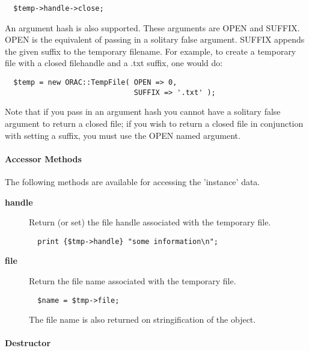 \begin{description}
\begin{description}
\begin{verbatim}
  $temp->handle->close;
\end{verbatim}


An argument hash is also supported. These arguments are OPEN and
SUFFIX. OPEN is the equivalent of passing in a solitary false
argument. SUFFIX appends the given suffix to the temporary
filename. For example, to create a temporary file with a closed
filehandle and a .txt suffix, one would do:

\begin{verbatim}
  $temp = new ORAC::TempFile( OPEN => 0,
                              SUFFIX => '.txt' );
\end{verbatim}


Note that if you pass in an argument hash you cannot have a solitary
false argument to return a closed file; if you wish to return a closed
file in conjunction with setting a suffix, you must use the OPEN named
argument.

\end{description}
\paragraph*{Accessor Methods\label{ORAC::TempFile_Accessor_Methods}}


The following methods are available for accessing the
'instance' data.

\begin{description}

\item[{\textbf{handle}}] \mbox{}

Return (or set) the file handle associated with the temporary
file.

\begin{verbatim}
  print {$tmp->handle} "some information\n";
\end{verbatim}

\item[{\textbf{file}}] \mbox{}

Return the file name associated with the temporary file.

\begin{verbatim}
  $name = $tmp->file;
\end{verbatim}


The file name is also returned on stringification of the object.

\end{description}
\paragraph*{Destructor\label{ORAC::TempFile_Destructor}}



\end{description}
